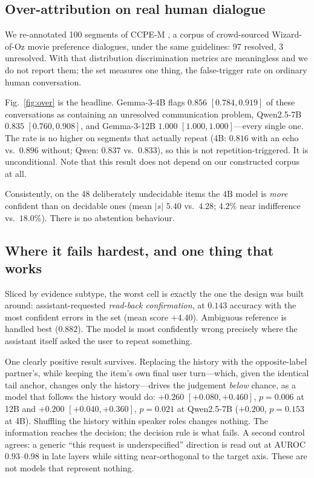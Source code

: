 \documentclass[conference]{IEEEtran}
\begin{document}
\subsection{Over-attribution on real human dialogue}
We re-annotated 100 segments of CCPE-M \cite{ccpem}, a corpus of crowd-sourced Wizard-of-Oz movie
preference dialogues, under the same guidelines: 97 resolved, 3 unresolved. With that distribution
discrimination metrics are meaningless and we do not report them; the set measures one thing, the
false-trigger rate on ordinary human conversation.

Fig.~\ref{fig:over} is the headline. Gemma-3-4B flags $0.856$ $[0.784,0.919]$ of these
conversations as containing an unresolved communication problem, Qwen2.5-7B $0.835$
$[0.760,0.908]$, and Gemma-3-12B $1.000$ $[1.000,1.000]$---every single one. The rate is no higher
on segments that actually repeat (4B: $0.816$ with an echo vs.\ $0.896$ without; Qwen: $0.837$ vs.\
$0.833$), so this is not repetition-triggered. It is unconditional. Note that this result does not
depend on our constructed corpus at all.

Consistently, on the 48 deliberately undecidable items the 4B model is \emph{more} confident than
on decidable ones (mean $|s|$ $5.40$ vs.\ $4.28$; $4.2\%$ near indifference vs.\ $18.0\%$). There is
no abstention behaviour.

\subsection{Where it fails hardest, and one thing that works}
Sliced by evidence subtype, the worst cell is exactly the one the design was built around:
assistant-requested \emph{read-back confirmation}, at $0.143$ accuracy with the most confident
errors in the set (mean score $+4.40$). Ambiguous reference is handled best ($0.882$). The model is
most confidently wrong precisely where the assistant itself asked the user to repeat something.

One clearly positive result survives. Replacing the history with the opposite-label partner's, while
keeping the item's own final user turn---which, given the identical tail anchor, changes only the
history---drives the judgement \emph{below} chance, as a model that follows the history would do:
$+0.260$ $[+0.080,+0.460]$, $p=0.006$ at 12B and $+0.200$ $[+0.040,+0.360]$, $p=0.021$ at
Qwen2.5-7B ($+0.200$, $p=0.153$ at 4B). Shuffling the history within speaker roles changes nothing.
The information reaches the decision; the decision rule is what fails. A second control agrees: a
generic ``this request is underspecified'' direction is read out at AUROC $0.93$--$0.98$ in late
layers while sitting near-orthogonal to the target axis. These are not models that represent
nothing.
\end{document}
